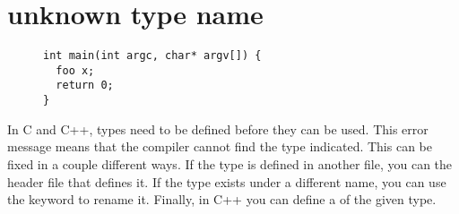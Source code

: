 \section{unknown type name}\label{sec:unknown-type}

\begin{figure}[htb]
\begin{lstlisting}
int main(int argc, char* argv[]) {
  foo x;
  return 0;
}
\end{lstlisting}
\label{ex:unknown-type}
\end{figure}

In C and C++, types need to be defined before they can be used.
This error message means that the compiler cannot find the type indicated.
This can be fixed in a couple different ways.
If the type is defined in another file, you can  the header file that defines it.
If the type exists under a different name, you can use the  keyword to rename it.
Finally, in C++ you can define a  of the given type.
\newpage